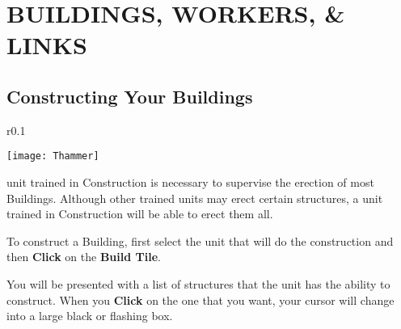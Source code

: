 
\chapter[Buildings, Workers, \& Links]{{\Huge B}UILDINGS, {\Huge W}ORKERS, {\Huge \&} {\Huge L}INKS}

\section{\textsf{Constructing Your Buildings}}


\begin{wrapfigure}{r}{0.1\textwidth}
    \vspace{-20pt}
    \begin{center}
        \texttt{[image: Thammer]}
    \end{center}
    \vspace{-20pt}
\end{wrapfigure}

 unit trained in Construction is necessary to supervise the erection of most Buildings. Although other trained units may erect certain structures, a unit trained in Construction will be able to erect them all.

To construct a Building, first select the unit that will do the construction and then \textbf{Click} on the \textbf{Build Tile}.

You will be presented with a list of structures that the unit has the ability to construct. When you \textbf{Click} on the one that you want, your cursor will change into a large black or flashing box.


